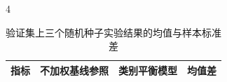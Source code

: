 \begin{PaperTable}{4}

\begin{table}[!htbp]
\centering\caption{验证集上三个随机种子实验结果的均值与样本标准差\label{q2-tab7}}
\begin{tabular}{@{}llll@{}}
\toprule
\begin{minipage}[b]{\dimexpr 0.290000\linewidth-1.740000\tabcolsep\relax}\raggedright
指标\strut
\end{minipage} & \begin{minipage}[b]{\dimexpr 0.280000\linewidth-1.680000\tabcolsep\relax}\raggedleft
不加权基线参照\strut
\end{minipage} & \begin{minipage}[b]{\dimexpr 0.280000\linewidth-1.680000\tabcolsep\relax}\raggedleft
类别平衡模型\strut
\end{minipage} & \begin{minipage}[b]{\dimexpr 0.150000\linewidth-0.900000\tabcolsep\relax}\raggedleft
均值差\strut
\end{minipage}\tabularnewline
\midrule


\end{tabular}
\end{table}
\end{PaperTable}
